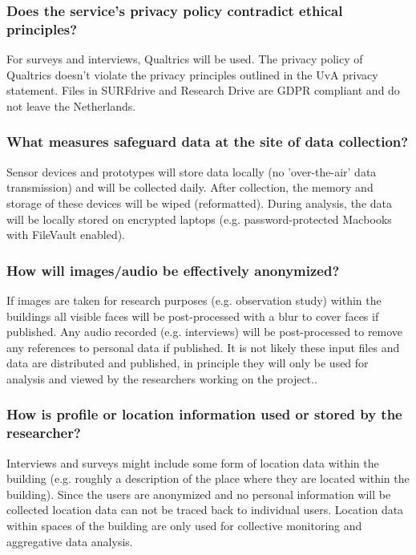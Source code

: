 \documentclass[a4paper]{article}
\begin{document}
\subsubsection{Does the service’s privacy policy contradict ethical principles?}

For surveys and interviews, Qualtrics will be used. The privacy policy of Qualtrics doesn't violate the privacy principles outlined in the UvA privacy statement. Files in SURFdrive and Research Drive are GDPR compliant and do not leave the Netherlands. 

\subsubsection{What measures safeguard data at the site of data collection?}

Sensor devices and prototypes will store data locally (no 'over-the-air' data transmission) and will be collected daily. After collection, the memory and storage of these devices will be wiped (reformatted). During analysis, the data will be locally stored on encrypted laptops (e.g. password-protected Macbooks with FileVault enabled). 

\subsubsection{How will images/audio be effectively anonymized?}

If images are taken for research purposes (e.g. observation study) within the buildings all visible faces will be post-processed with a blur to cover faces if published. Any audio recorded (e.g. interviews) will be post-processed to remove any references to personal data if published. It is not likely these input files and data are distributed and published, in principle they will only be used for analysis and viewed by the researchers working on the project..

\subsubsection{How is profile or location information used or stored by the researcher?}

Interviews and surveys might include some form of location data within the building (e.g. roughly a description of the place where they are located within the building). Since the users are anonymized and no personal information will be collected location data can not be traced back to individual users. Location data within spaces of the building are only used for collective monitoring and aggregative data analysis.
\end{document}

